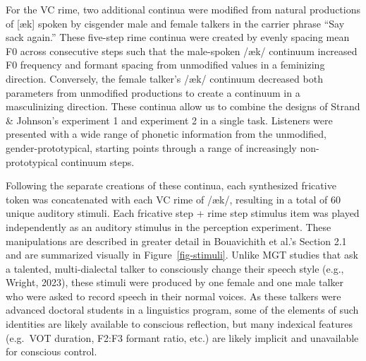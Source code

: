 \documentclass[
  letterpaper,
  DIV=11,
  numbers=noendperiod]{scrartcl}
\begin{document}
For the VC rime, two additional continua were modified from natural
productions of {[}æk{]} spoken by cisgender male and female talkers in
the carrier phrase ``Say sack again.'' These five-step rime continua
were created by evenly spacing mean F0 across consecutive steps such
that the male-spoken /æk/ continuum increased F0 frequency and formant
spacing from unmodified values in a feminizing direction. Conversely,
the female talker's /æk/ continuum decreased both parameters from
unmodified productions to create a continuum in a masculinizing
direction. These continua allow us to combine the designs of Strand \&
Johnson's experiment 1 and experiment 2 in a single task. Listeners were
presented with a wide range of phonetic information from the unmodified,
gender-prototypical, starting points through a range of increasingly
non-prototypical continuum steps.

Following the separate creations of these continua, each synthesized
fricative token was concatenated with each VC rime of /æk/, resulting in
a total of 60 unique auditory stimuli. Each fricative step + rime step
stimulus item was played independently as an auditory stimulus in the
perception experiment. These manipulations are described in greater
detail in Bouavichith et al.'s Section 2.1 and are summarized visually
in Figure~\ref{fig-stimuli}. Unlike MGT studies that ask a talented,
multi-dialectal talker to consciously change their speech style (e.g.,
Wright, 2023), these stimuli were produced by one female and one male
talker who were asked to record speech in their normal voices. As these
talkers were advanced doctoral students in a linguistics program, some
of the elements of such identities are likely available to conscious
reflection, but many indexical features (e.g.~VOT duration, F2:F3
formant ratio, etc.) are likely implicit and unavailable for conscious
control.
\end{document}
